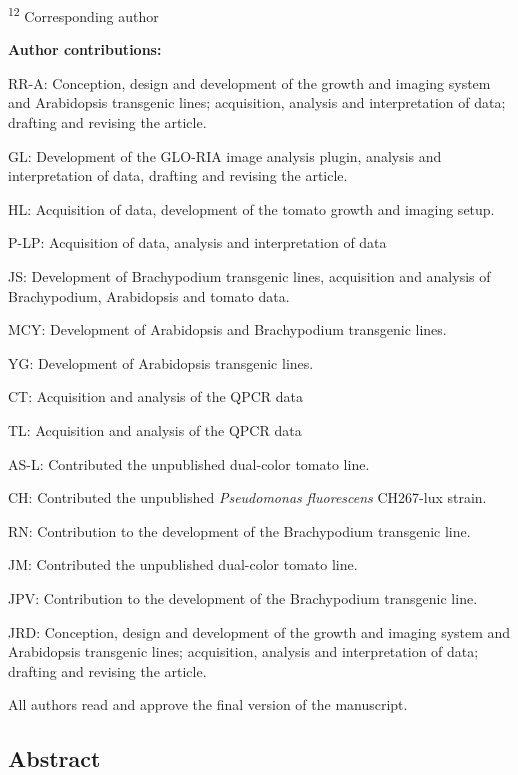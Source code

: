 \documentclass[]{article}
\begin{document}
\textsuperscript{12} Corresponding author

\textbf{Author contributions:}

RR-A: Conception, design and development of the growth and imaging
system and Arabidopsis transgenic lines; acquisition, analysis and
interpretation of data; drafting and revising the article.

GL: Development of the GLO-RIA image analysis plugin, analysis and
interpretation of data, drafting and revising the article.

HL: Acquisition of data, development of the tomato growth and imaging
setup.

P-LP: Acquisition of data, analysis and interpretation of data

JS: Development of Brachypodium transgenic lines, acquisition and
analysis of Brachypodium, Arabidopsis and tomato data.

MCY: Development of Arabidopsis and Brachypodium transgenic lines.

YG: Development of Arabidopsis transgenic lines.

CT: Acquisition and analysis of the QPCR data

TL: Acquisition and analysis of the QPCR data

AS-L: Contributed the unpublished dual-color tomato line.

CH: Contributed the unpublished \emph{Pseudomonas fluorescens} CH267-lux
strain.

RN: Contribution to the development of the Brachypodium transgenic line.

JM: Contributed the unpublished dual-color tomato line.

JPV: Contribution to the development of the Brachypodium transgenic
line.

JRD: Conception, design and development of the growth and imaging system
and Arabidopsis transgenic lines; acquisition, analysis and
interpretation of data; drafting and revising the article.

All authors read and approve the final version of the manuscript.

\subsection{Abstract}\label{abstract}
\end{document}
